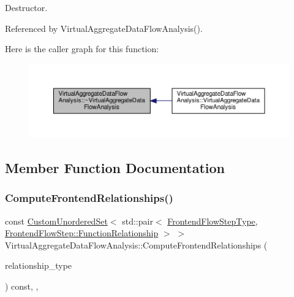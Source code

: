 Destructor. 



Referenced by Virtual\+Aggregate\+Data\+Flow\+Analysis().

Here is the caller graph for this function\+:
\nopagebreak
\begin{figure}[H]
\begin{center}
\leavevmode
\includegraphics[width=350pt]{d3/dfc/classVirtualAggregateDataFlowAnalysis_a0a7d2a546e118b90fcf6c70696877a57_icgraph}
\end{center}
\end{figure}


\subsection{Member Function Documentation}
\mbox{\label{classVirtualAggregateDataFlowAnalysis_a4bd20d214944424a56ea9699b232d597}} 
\subsubsection{\texorpdfstring{Compute\+Frontend\+Relationships()}{ComputeFrontendRelationships()}}
{\footnotesize\ttfamily const \hyperlink{classCustomUnorderedSet}{Custom\+Unordered\+Set}$<$ std\+::pair$<$ \hyperlink{frontend__flow__step_8hpp_afeb3716c693d2b2e4ed3e6d04c3b63bb}{Frontend\+Flow\+Step\+Type}, \hyperlink{classFrontendFlowStep_af7cf30f2023e5b99e637dc2058289ab0}{Frontend\+Flow\+Step\+::\+Function\+Relationship} $>$ $>$ Virtual\+Aggregate\+Data\+Flow\+Analysis\+::\+Compute\+Frontend\+Relationships (\begin{DoxyParamCaption}\item[{const \hyperlink{classDesignFlowStep_a723a3baf19ff2ceb77bc13e099d0b1b7}{Design\+Flow\+Step\+::\+Relationship\+Type}}]{relationship\+\_\+type }\end{DoxyParamCaption}) const\hspace{0.3cm}{\ttfamily [override]}, {\ttfamily [private]}, {\ttfamily [virtual]}}



